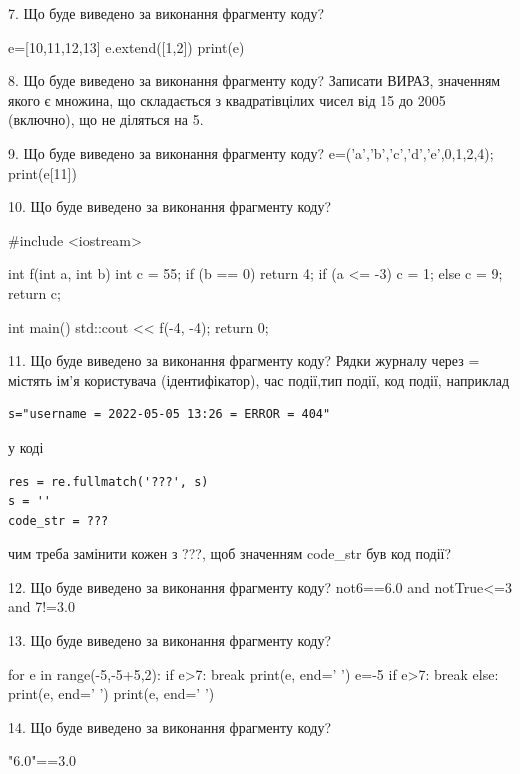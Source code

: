 \documentclass[11pt]{article}
\begin{document}

7. Що буде виведено за виконання фрагменту коду?

e=[10,11,12,13]
e.extend([1,2])
print(e)



8. Що буде виведено за виконання фрагменту коду?
Записати ВИРАЗ, значенням якого є множина, що складається з квадратівцілих чисел від 15 до 2005 (включно), що не діляться на 5.

9. Що буде виведено за виконання фрагменту коду?
e=('a','b','c','d','e',0,1,2,4); print(e[11])

10. Що буде виведено за виконання фрагменту коду?

#include <iostream>

int f(int a, int b){
    int c = 55;
    if (b == 0)
        return 4;
    if (a <= -3)
         c = 1;
    else 
        c = 9;
    return c;
}

int main(){
    std::cout << f(-4, -4);
    return 0;
}


11. Що буде виведено за виконання фрагменту коду?
Рядки журналу через = містять ім'я користувача (ідентифікатор), час події,тип події, код події, наприклад
\begin{verbatim}
s="username = 2022-05-05 13:26 = ERROR = 404"
\end{verbatim}
у коді 
\begin{verbatim}
res = re.fullmatch('???', s) 
s = ''
code_str = ??? 
\end{verbatim}
чим треба замінити кожен з ???, щоб значенням code\_str був код події? 




12. Що буде виведено за виконання фрагменту коду?
not6==6.0 and notTrue<=3 and 7!=3.0

13. Що буде виведено за виконання фрагменту коду?

for e in range(-5,-5+5,2):
    if e>7:
        break
    print(e, end=' ')
    e=-5
    if e>7:
        break
else:
    print(e, end=' ')
print(e, end=' ')


14. Що буде виведено за виконання фрагменту коду?

"6.0"==3.0

\end{document}
